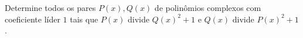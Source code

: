 Determine todos os pares \(P(x),Q(x)\) de polinômios complexos com coeficiente líder \(1\) tais que \(P(x)\) divide \(Q(x)^2+1\) e \(Q(x)\) divide \(P(x)^2+1\).
